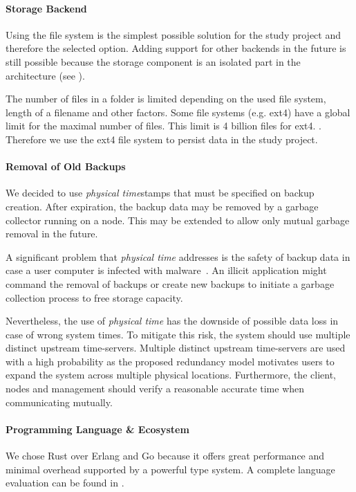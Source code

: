 \paragraph{Storage Backend}
Using the file system is the simplest possible solution for the study project and therefore the selected option. Adding support for other backends in the future is still possible because the storage component is an isolated part in the architecture (see ).

The number of files in a folder is limited depending on the used file system, length of a filename and other factors. Some file systems (e.g. ext4) have a global limit for the maximal number of files. This limit is 4 billion files for ext4. \cite{ext4}. Therefore we use the ext4 file system to persist data in the study project.

\paragraph{Removal of Old Backups}\label{sec:removal-of-old-backups}
We decided to use \emph{physical time}stamps that must be specified on backup creation. After expiration, the backup data may be removed by a garbage collector running on a \gls{node}. This may be extended to allow only mutual garbage removal in the future.

A significant problem that \emph{physical time} addresses is the safety of backup data in case a user computer is infected with malware~\cite{young-cryptovirology}. An illicit application might command the removal of backups or create new backups to initiate a garbage collection process to free storage capacity.

Nevertheless, the use of \emph{physical time} has the downside of possible data loss in case of wrong system times. To mitigate this risk, the system should use multiple distinct upstream time-servers. Multiple distinct upstream time-servers are used with a high probability as the proposed redundancy model motivates users to expand the system across multiple physical locations. Furthermore, the \gls{client}, \glspl{node} and \gls{management} should verify a reasonable accurate time when communicating mutually.

\paragraph{Programming Language \& Ecosystem}
We chose Rust over Erlang and Go because it offers great performance and minimal overhead supported by a powerful type system.
A complete language evaluation can be found in .

